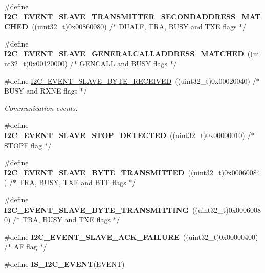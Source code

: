 \begin{DoxyCompactItemize}
\#define {\bfseries I2\+C\+\_\+\+E\+V\+E\+N\+T\+\_\+\+S\+L\+A\+V\+E\+\_\+\+T\+R\+A\+N\+S\+M\+I\+T\+T\+E\+R\+\_\+\+S\+E\+C\+O\+N\+D\+A\+D\+D\+R\+E\+S\+S\+\_\+\+M\+A\+T\+C\+H\+ED}~((uint32\+\_\+t)0x00860080)  /$\ast$ D\+U\+A\+L\+F, T\+R\+A, B\+U\+S\+Y and T\+X\+E flags $\ast$/
\item 
\mbox{\label{group___i2_c___events_ga15195f6def95f688ae9725899f49ea23}} 
\#define {\bfseries I2\+C\+\_\+\+E\+V\+E\+N\+T\+\_\+\+S\+L\+A\+V\+E\+\_\+\+G\+E\+N\+E\+R\+A\+L\+C\+A\+L\+L\+A\+D\+D\+R\+E\+S\+S\+\_\+\+M\+A\+T\+C\+H\+ED}~((uint32\+\_\+t)0x00120000)  /$\ast$ G\+E\+N\+C\+A\+L\+L and B\+U\+S\+Y flags $\ast$/
\item 
\#define \mbox{\hyperlink{group___i2_c___events_ga8b244626839940569c6c8bbfc4efe21d}{I2\+C\+\_\+\+E\+V\+E\+N\+T\+\_\+\+S\+L\+A\+V\+E\+\_\+\+B\+Y\+T\+E\+\_\+\+R\+E\+C\+E\+I\+V\+ED}}~((uint32\+\_\+t)0x00020040)  /$\ast$ B\+U\+S\+Y and R\+X\+N\+E flags $\ast$/
\begin{DoxyCompactList}\small\item\em Communication events. \end{DoxyCompactList}\item 
\mbox{\label{group___i2_c___events_ga3148d8d7087e418959bc31e2646b2941}} 
\#define {\bfseries I2\+C\+\_\+\+E\+V\+E\+N\+T\+\_\+\+S\+L\+A\+V\+E\+\_\+\+S\+T\+O\+P\+\_\+\+D\+E\+T\+E\+C\+T\+ED}~((uint32\+\_\+t)0x00000010)  /$\ast$ S\+T\+O\+P\+F flag $\ast$/
\item 
\mbox{\label{group___i2_c___events_ga50652880323b8c2746b5afbdfea03fe1}} 
\#define {\bfseries I2\+C\+\_\+\+E\+V\+E\+N\+T\+\_\+\+S\+L\+A\+V\+E\+\_\+\+B\+Y\+T\+E\+\_\+\+T\+R\+A\+N\+S\+M\+I\+T\+T\+ED}~((uint32\+\_\+t)0x00060084)  /$\ast$ T\+R\+A, B\+U\+S\+Y, T\+X\+E and B\+T\+F flags $\ast$/
\item 
\mbox{\label{group___i2_c___events_gaa574c93a99497649f3d8e7ff53796231}} 
\#define {\bfseries I2\+C\+\_\+\+E\+V\+E\+N\+T\+\_\+\+S\+L\+A\+V\+E\+\_\+\+B\+Y\+T\+E\+\_\+\+T\+R\+A\+N\+S\+M\+I\+T\+T\+I\+NG}~((uint32\+\_\+t)0x00060080)  /$\ast$ T\+R\+A, B\+U\+S\+Y and T\+X\+E flags $\ast$/
\item 
\mbox{\label{group___i2_c___events_ga249bd611f1ca64653c0bfc606c591088}} 
\#define {\bfseries I2\+C\+\_\+\+E\+V\+E\+N\+T\+\_\+\+S\+L\+A\+V\+E\+\_\+\+A\+C\+K\+\_\+\+F\+A\+I\+L\+U\+RE}~((uint32\+\_\+t)0x00000400)  /$\ast$ A\+F flag $\ast$/
\item 
\#define {\bfseries I\+S\+\_\+\+I2\+C\+\_\+\+E\+V\+E\+NT}(E\+V\+E\+NT)
\end{DoxyCompactItemize}


